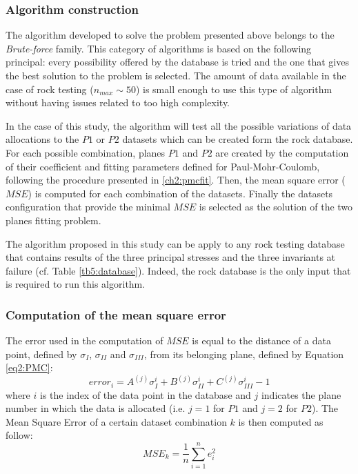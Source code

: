 \subsubsection{Algorithm construction}

The algorithm developed to solve the problem presented above belongs to the \emph{Brute-force} family. This category of algorithms is based on the following principal: every possibility offered by the database is tried and the one that gives the best solution to the problem is selected. The amount of data available in the case of rock testing ($n_{max}\sim 50$) is small enough to use this type of algorithm without having issues related to too high complexity. 

In the case of this study, the algorithm will test all the possible variations of data allocations to the $P1$ or $P2$ datasets which can be created form the rock database. For each possible combination, planes $P1$ and $P2$ are created by the computation of their coefficient and fitting parameters defined for Paul-Mohr-Coulomb, following the procedure presented in \ref{ch2:pmcfit}. Then, the mean square error ($MSE$) is computed for each combination of the datasets. Finally the datasets configuration that provide the minimal $MSE$ is selected as the solution of the two planes fitting problem.  

The algorithm proposed in this study can be apply to any rock testing database that contains results of the three principal stresses and the three invariants at failure (cf. Table \ref{tb5:database}). Indeed, the rock database is the only input that is required to run this algorithm. 

\subsubsection{Computation of the mean square error}

The error used in the computation of $MSE$ is equal to the distance of a data point, defined by $\sigma_I$, $\sigma_{II}$ and $\sigma_{III}$, from its belonging plane, defined by Equation \ref{eq2:PMC}:
\begin{equation}\label{eq5:error}
    error_{i} = A^{(j)}\sigma_I^{i}+B^{(j)}\sigma_{II}^{i}+C^{(j)}\sigma_{III}^{i} - 1
\end{equation}
where $i$ is the index of the data point in the database and $j$ indicates the plane number in which the data is allocated (i.e. $j=1$ for $P1$ and $j=2$ for $P2$). The Mean Square Error of a certain dataset combination $k$ is then computed as follow:
\begin{equation}\label{eq5:MSE}
    MSE_k = \frac{1}{n}\sum_{i=1}^{n} e_i^2
\end{equation}

